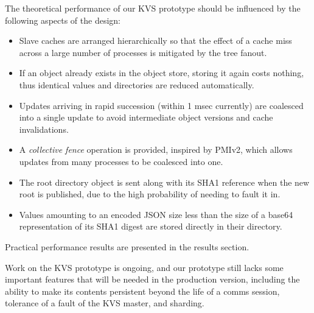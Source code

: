 The theoretical performance of our KVS prototype should be influenced by
the following aspects of the design:
\begin{itemize}
\item{Slave caches are arranged hierarchically so that the effect of a
cache miss across a large number of processes is mitigated by the tree
fanout.}
\item{If an object already exists in the object store, storing it again
costs nothing, thus identical values and directories are reduced automatically.}
\item{Updates arriving in rapid succession (within 1 msec currently) are
coalesced into a single update to avoid intermediate object versions and
cache invalidations.}
\item{A {\em collective fence} operation is provided, inspired by PMIv2,
which allows updates from many processes to be coalesced into one.}
\item{The root directory object is sent along with its SHA1 reference when the
new root is published, due to the high probability of needing to fault it in.}
\item{Values amounting to an encoded JSON size less than the size of a base64
representation of its SHA1 digest are stored directly in their directory.}
\end{itemize}
Practical performance results are presented in the results section.

Work on the KVS prototype is ongoing, and our prototype still lacks some
important features that will be needed in the production version,
including the ability to make its contents persistent beyond the
life of a comms session,
tolerance of a fault of the KVS master,
and sharding.
